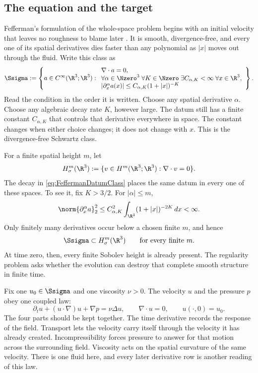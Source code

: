 \subsection{The equation and the target}\label{sub:TheEquationAndTheTarget}

Fefferman's formulation of the whole-space problem begins with an initial
velocity that leaves no roughness to blame later \parencite{Fefferman2000}.
It is smooth, divergence-free, and every one of its spatial derivatives dies
faster than any polynomial as \(|x|\) moves out through the fluid.  Write this
class as
\begin{equation}\label{eq:FeffermanDatumClass}
  \Ssigma
  :=
  \left\{
  a\in C^\infty(\R^3;\R^3):
  \begin{array}{l}
    \nabla\cdot a=0,\\
    \forall\alpha\in\Nzero^3\;
    \forall K\in\Nzero\;
    \exists C_{\alpha,K}<\infty\;
    \forall x\in\R^3,\\
    |\partial_x^\alpha a(x)|
    \leq C_{\alpha,K}(1+|x|)^{-K}
  \end{array}
  \right\}.
\end{equation}
Read the condition in the order it is written.  Choose any spatial derivative
\(\alpha\).  Choose any algebraic decay rate \(K\), however large.  The datum
still has a finite constant \(C_{\alpha,K}\) that controls that derivative
everywhere in space.  The constant changes when either choice changes; it does
not change with \(x\).  This is the divergence-free Schwartz class.

For a finite spatial height \(m\), let
\[
  H^m_\sigma(\R^3)
  :=
  \{v\in H^m(\R^3;\R^3):\nabla\cdot v=0\}.
\]
The decay in \eqref{eq:FeffermanDatumClass} places the same datum in every one
of these spaces.  To see it, fix \(K>3/2\).  For \(|\alpha|\leq m\),
\[
  \norm{\partial_x^\alpha a}_2^2
  \leq
  C_{\alpha,K}^2
  \int_{\R^3}(1+|x|)^{-2K}\,dx
  <\infty.
\]
Only finitely many derivatives occur below a chosen finite \(m\), and hence
\begin{equation}\label{eq:SchwartzToEveryFiniteSobolevHeight}
  \Ssigma\subset H^m_\sigma(\R^3)
  \qquad\text{for every finite }m.
\end{equation}
At time zero, then, every finite Sobolev height is already present.  The
regularity problem asks whether the evolution can destroy that complete
smooth structure in finite time.

Fix one \(u_0\in\Ssigma\) and one viscosity \(\nu>0\).  The velocity \(u\) and
the pressure \(p\) obey one coupled law:
\begin{equation}\label{eq:NavierStokesSystem}
  \partial_tu+(u\cdot\nabla)u+\nabla p=\nu\Delta u,
  \qquad \nabla\cdot u=0,
  \qquad u(\cdot,0)=u_0.
\end{equation}
The four parts should be kept together.  The time derivative records the
response of the field.  Transport lets the velocity carry itself through the
velocity it has already created.  Incompressibility forces pressure to answer
for that motion across the surrounding field.  Viscosity acts on the spatial
curvature of the same velocity.  There is one fluid here, and every later
derivative row is another reading of this law.

